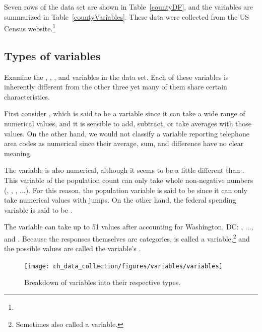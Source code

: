 \noindent Seven rows of the  data set are shown in Table~\ref{countyDF}, and the variables are summarized in Table~\ref{countyVariables}. These data were collected from the US Census website.\footnote{}


\subsection{Types of variables}
\label{variableTypes}

Examine the , , , and  variables in the  data set. Each of these variables is inherently different from the other three yet many of them share certain characteristics.

First consider , which is said to be a  variable since it can take a wide range of numerical values, and it is sensible to add, subtract, or take averages with those values. On the other hand, we would not classify a variable reporting telephone area codes as numerical since their average, sum, and difference have no clear meaning.

The  variable is also numerical, although it seems to be a little different than . This variable of the population count can only take whole non-negative numbers (, , , ...). For this reason, the population variable is said to be  since it can only take numerical values with jumps. On the other hand, the federal spending variable is said to be .

The variable  can take up to 51 values after accounting for Washington, DC: , ..., and . Because the responses themselves are categories,  is called a  variable,\footnote{Sometimes also called a  variable.} and the possible values are called the variable's .

\begin{figure}
\centering
\texttt{[image: ch\_data\_collection/figures/variables/variables]}
\caption{Breakdown of variables into their respective types.}
\label{variables}
\end{figure}

